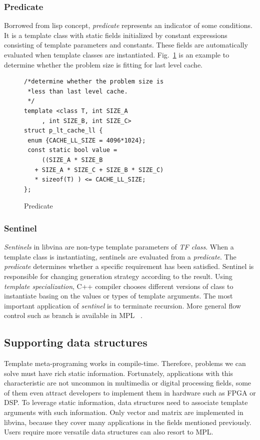 \documentclass[10pt, conference, compsocconf]{IEEEtran}
\begin{document}
\subsubsection{Predicate}
Borrowed from lisp concept, \emph{predicate} represents an indicator
of some conditions. It is a template class with static
fields initialized by constant expressions consisting of template
parameters and constants. These fields are automatically evaluated
when template classes are instantiated. Fig.~\ref{lst:pred} is an example to determine whether the problem size is fitting for last level cache.

\begin{figure}[!htp]
\begin{minipage}[tb]{\linewidth}
\makebox[\textwidth]{\hrulefill}
\begin{small}
\begin{verbatim}
/*determine whether the problem size is 
 *less than last level cache.
 */
template <class T, int SIZE_A
     , int SIZE_B, int SIZE_C>
struct p_lt_cache_ll {
 enum {CACHE_LL_SIZE = 4096*1024};
 const static bool value = 
     ((SIZE_A * SIZE_B 
   + SIZE_A * SIZE_C + SIZE_B * SIZE_C) 
   * sizeof(T) ) <= CACHE_LL_SIZE;
};
\end{verbatim}
\end{small}
\vspace{-1ex}\makebox[\textwidth]{\hrulefill}
\end{minipage}
\caption{Predicate}\label{lst:pred}
\end{figure}

\subsubsection{Sentinel}
\emph{Sentinels} in libvina are non-type template parameters of
\emph{TF class}. When a template class is instantiating, sentinels are
evaluated from a \emph{predicate}.  The \emph{predicate} determines
whether a specific requirement has been satisfied. Sentinel is
responsible for changing generation strategy according to the
result. Using \emph{template specialization}, C++ compiler chooses
different versions of class to instantiate basing on the values or
types of template arguments. The most important application of
\emph{sentinel} is to  terminate recursion. More general flow control
such as branch is available in MPL ~\cite{mpl}.

\subsection{Supporting data structures}
Template meta-programing works in compile-time. Therefore, problems we can solve must have rich static
information. Fortunately,  applications with this characteristic are
not uncommon in multimedia or digital processing fields, some of them 
even attract developers to implement them in hardware such as FPGA or DSP. To leverage
static information, data structures need to associate template
arguments with such information. Only vector and matrix are implemented in libvina,
because they cover many applications in the fields mentioned
previously. Users require more versatile data structures can also
resort to MPL.
\end{document}
